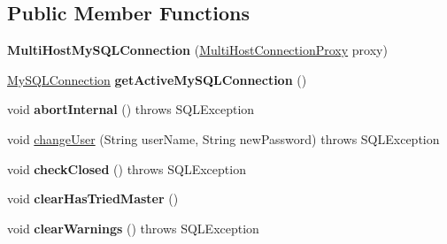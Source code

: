 \subsection*{Public Member Functions}
\begin{DoxyCompactItemize}
\item 
\mbox{\label{classcom_1_1mysql_1_1jdbc_1_1_multi_host_my_s_q_l_connection_abf39b83778a9c016abeeb6022cb34024}} 
{\bfseries Multi\+Host\+My\+S\+Q\+L\+Connection} (\mbox{\hyperlink{classcom_1_1mysql_1_1jdbc_1_1_multi_host_connection_proxy}{Multi\+Host\+Connection\+Proxy}} proxy)
\item 
\mbox{\label{classcom_1_1mysql_1_1jdbc_1_1_multi_host_my_s_q_l_connection_af6fde4a960d766e1ed7d3d7a7204408f}} 
\mbox{\hyperlink{interfacecom_1_1mysql_1_1jdbc_1_1_my_s_q_l_connection}{My\+S\+Q\+L\+Connection}} {\bfseries get\+Active\+My\+S\+Q\+L\+Connection} ()
\item 
\mbox{\label{classcom_1_1mysql_1_1jdbc_1_1_multi_host_my_s_q_l_connection_a965f68816e3360aeb4379a1338929a12}} 
void {\bfseries abort\+Internal} ()  throws S\+Q\+L\+Exception 
\item 
void \mbox{\hyperlink{classcom_1_1mysql_1_1jdbc_1_1_multi_host_my_s_q_l_connection_aae20768c54f41ae55ba08171a06b4a11}{change\+User}} (String user\+Name, String new\+Password)  throws S\+Q\+L\+Exception 
\item 
\mbox{\label{classcom_1_1mysql_1_1jdbc_1_1_multi_host_my_s_q_l_connection_ae0c9e7e2b6fc63df8fe51def6f6b9a97}} 
void {\bfseries check\+Closed} ()  throws S\+Q\+L\+Exception 
\item 
\mbox{\label{classcom_1_1mysql_1_1jdbc_1_1_multi_host_my_s_q_l_connection_a9bf7b467fe175b88f7a9927055099ea2}} 
void {\bfseries clear\+Has\+Tried\+Master} ()
\item 
\mbox{\label{classcom_1_1mysql_1_1jdbc_1_1_multi_host_my_s_q_l_connection_a682b98163e944c9a1fe0f568e6cb1796}} 
void {\bfseries clear\+Warnings} ()  throws S\+Q\+L\+Exception 

\end{DoxyCompactItemize}

